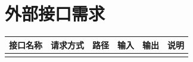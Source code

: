 \section{外部接口需求}

\begin{longtable}{|p{24mm}|p{18mm}|p{32mm}|p{26mm}|p{26mm}|p{26mm}|}
\hline
\textbf{接口名称} & \textbf{请求方式} & \textbf{路径} & \textbf{输入} & \textbf{输出} & \textbf{说明} \\
\hline
 &  &  &  &  &  \\
\hline
\end{longtable}
